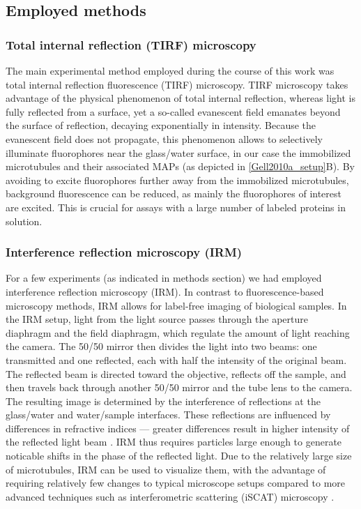 \subsection{Employed methods}
\label{sec:methods_intro}
\subsubsection{Total internal reflection (TIRF) microscopy}
The main experimental method employed during the course of this work was total internal reflection fluorescence (TIRF) microscopy. TIRF microscopy takes advantage of the physical phenomenon of total internal reflection, whereas light is fully reflected from a surface, yet a so-called evanescent field emanates beyond the surface of reflection, decaying exponentially in intensity. Because the evanescent field does not propagate, this phenomenon allows to selectively illuminate fluorophores near the glass/water surface, in our case the immobilized microtubules and their associated MAPs (as depicted in \ref{Gell2010a_setup}B). By avoiding to excite fluorophores further away from the immobilized microtubules, background fluorescence can be reduced, as mainly the fluorophores of interest are excited. This is crucial for assays with a large number of labeled proteins in solution. 

\subsubsection{Interference reflection microscopy (IRM)}
For a few experiments (as indicated in methods section) we had employed interference reflection microscopy (IRM). In contrast to fluorescence-based microscopy methods, IRM allows for label-free imaging of biological samples. In the IRM setup, light from the light source passes through the aperture diaphragm and the field diaphragm, which regulate the amount of light reaching the camera. The 50/50 mirror then divides the light into two beams: one transmitted and one reflected, each with half the intensity of the original beam. The reflected beam is directed toward the objective, reflects off the sample, and then travels back through another 50/50 mirror and the tube lens to the camera. The resulting image is determined by the interference of reflections at the glass/water and water/sample interfaces. These reflections are influenced by differences in refractive indices — greater differences result in higher intensity of the reflected light beam \parencite{barr2009interference}. IRM thus requires particles large enough to generate noticable shifts in the phase of the reflected light. Due to the relatively large size of microtubules, IRM can be used to visualize them, with the advantage of requiring relatively few changes to typical microscope setups compared to more advanced techniques such as interferometric scattering
(iSCAT) microscopy \parencite{Mahamdeh2018}.

